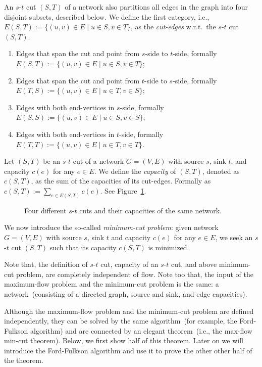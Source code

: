 An $s$-$t$ cut $(S, T)$ of a network also partitions all
edges in the graph into four disjoint subsets, described below. 
We define the first category, i.e., $E(S, T) := \{(u,v)\in E\mid u\in S, v\in T\}$,
as the \emph{cut-edges} w.r.t.\ the $s$-$t$ cut $(S, T)$.
\vspace*{-\topsep}
\begin{enumerate}
\item Edges that span the cut and point from $s$-side to $t$-side, formally $E(S, T) := \{(u,v)\in E\mid u\in S, v\in T\}$;
\item Edges that span the cut and point from $t$-side to $s$-side, formally $E(T, S) := \{(u,v)\in E\mid u\in T, v\in S\}$;
\item Edges with both end-vertices in $s$-side, formally $E(S, S) := \{(u,v)\in E\mid u\in S, v\in S\}$;
\item Edges with both end-vertices in $t$-side, formally $E(T, T) := \{(u,v)\in E\mid u\in T, v\in T\}$.
\end{enumerate}

Let $(S, T)$ be an $s$-$t$ cut of a network $G = (V, E)$ with source $s$, sink $t$, and capacity $c(e)$ for any $e\in E$.
We define the \emph{capacity} of $(S, T)$, denoted as $c(S, T)$, as the sum of the capacities of its cut-edges. Formally
as $c(S, T) := \sum_{e\in E(S, T)} c(e)$. See Figure~\ref{fig:flow-cut}.

\begin{figure}[h]
\centering{}
\caption{Four different $s$-$t$ cuts and their capacities of the same network.}
\label{fig:flow-cut}
\end{figure}

We now introduce the so-called \emph{minimum-cut problem}: given network $G = (V, E)$ with source $s$, sink $t$ and capacity $c(e)$ for any $e\in E$,
   we seek an $s$-$t$ cut $(S, T)$ such that its capacity $c(S, T)$ is minimized.

Note that, the definition of $s$-$t$ cut, capacity of an $s$-$t$ cut, and above minimum-cut problem,
are completely independent of flow. Note too that, the input of the maximum-flow problem and the minimum-cut
problem is the same: a network~(consisting of a directed graph, source and sink, and edge capacities).

Although the maximum-flow problem and the minimum-cut problem are defined independently, they
can be solved by the same algorithm~(for example, the Ford-Fulkson algorithm)
and are connected by an elegant theorem~(i.e., the max-flow min-cut theorem).
Below, we first show half of this theorem.
Later on we will introduce the Ford-Fulkson algorithm
and use it to prove the other other half of the theorem.

